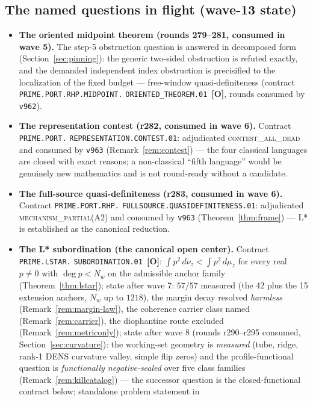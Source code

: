 \documentclass[11pt]{article}
\newcommand{\mO}{\textcolor{openred}{\textbf{[O]}}}
\theoremstyle{definition}
\theoremstyle{remark}
\begin{document}
\subsection{The named questions in flight (wave-13 state)}
\begin{itemize}[leftmargin=2em]
\item \textbf{The oriented midpoint theorem (rounds 279--281, consumed
in wave 5).}  The step-5 obstruction question is answered in
decomposed form (Section~\ref{sec:pinning}): the generic two-sided
obstruction is refuted exactly, and the demanded independent index
obstruction is precisified to the localization of the fixed budget ---
free-window quasi-definiteness (contract
\texttt{PRIME.PORT.RHP.MIDPOINT.}\allowbreak
\texttt{ORIENTED\_THEOREM.01}~\mO, rounds consumed by
\texttt{v962}).
\item \textbf{The representation contest (r282, consumed in wave 6).}
Contract \texttt{PRIME.PORT.}\allowbreak
\texttt{REPRESENTATION.CONTEST.01}: adjudicated
\textsc{contest\_all\_dead} and consumed by \texttt{v963}
(Remark~\ref{rem:contest}) --- the four classical languages are closed
with exact reasons; a non-classical ``fifth language'' would be
genuinely new mathematics and is not round-ready without a candidate.
\item \textbf{The full-source quasi-definiteness (r283, consumed in
wave 6).}  Contract \texttt{PRIME.PORT.RHP.}\allowbreak
\texttt{FULLSOURCE.QUASIDEFINITENESS.01}: adjudicated
\textsc{mechanism\_partial}(A2) and consumed by \texttt{v963}
(Theorem~\ref{thm:frame}) --- L* is established as the canonical
reduction.
\item \textbf{The L* subordination (the canonical open center).}
Contract \texttt{PRIME.LSTAR.}\allowbreak
\texttt{SUBORDINATION.01}~\mO: $\int p^2\,d\nu_z<\int p^2\,d\mu_z$ for
every real $p\ne0$ with $\deg p<N_w$ on the admissible anchor family
(Theorem~\ref{thm:lstar}); state after wave 7: $57/57$ measured (the
42 plus the 15 extension anchors, $N_w$ up to $1218$), the margin
decay resolved \emph{harmless} (Remark~\ref{rem:margin-law}), the
coherence carrier class named (Remark~\ref{rem:carrier}), the
diophantine route excluded (Remark~\ref{rem:metriconly}); state after
wave 8 (rounds r290--r295 consumed, Section~\ref{sec:curvature}): the
working-set geometry is \emph{measured} (tube, ridge, rank-1 DENS
curvature valley, simple flip zeros) and the profile-functional
question is \emph{functionally negative-sealed} over five class
families (Remark~\ref{rem:killcatalog}) --- the successor question is
the closed-functional contract below; standalone problem statement in

\end{itemize}
\end{document}
